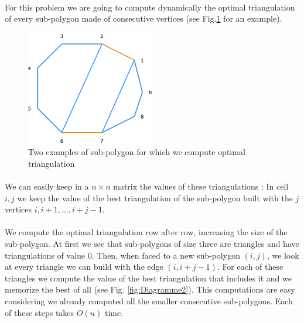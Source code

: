
\paragraph{}
For this problem we are going to compute dynamically the optimal triangulation of every sub-polygon made of consecutive vertices (see Fig.\ref{fig:Diagramme1} for an example).

\begin{figure}[h]
	\centering
		\includegraphics[width=0.5\textwidth]{Diagramme1.png}
	\caption{Two examples of sub-polygon for which we compute optimal triangulation}
	\label{fig:Diagramme1}
\end{figure}

\paragraph{}
We can easily keep in a $n\times n$ matrix the values of these triangulations : In cell $i,j$ we keep the value of the best triangulation of the sub-polygon built with the $j$ vertices $i,i+1,...,i+j-1$.

\paragraph{} 
We compute the optimal triangulation row after row, increasing the size of the sub-polygon. At first we see that sub-polygons of size three are triangles and have triangulations of value 0. Then, when faced to a new sub-polygon $(i,j)$, we look at every triangle we can build with the edge $(i, i+j-1)$. For each of these triangles we compute the value of the best triangulation that includes it and we memorize the best of all (see Fig. \ref{fig:Diagramme2}). This computations are easy considering we already computed all the smaller consecutive sub-polygons. Each of these steps takes $O(n)$ time.

